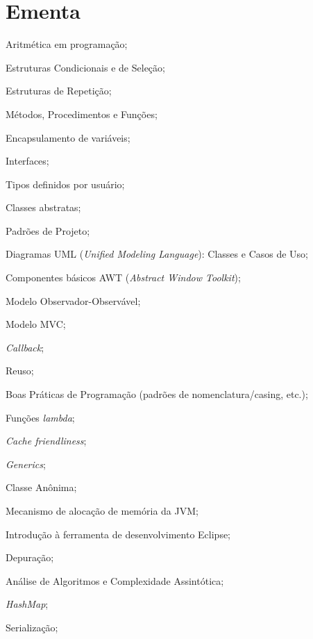 \documentclass{article}
\begin{document}
\section{Ementa}
\begin{itemize*}[label={}]
     \item Aritmética em programação;
     \item Estruturas Condicionais e de Seleção;
     \item Estruturas de Repetição;
     \item Métodos, Procedimentos e Funções;
     \item Encapsulamento de variáveis;
     \item Interfaces;
     \item Tipos definidos por usuário;
     \item Classes abstratas;
     \item Padrões de Projeto;
     \item Diagramas UML (\textit{Unified Modeling Language}): Classes
         e Casos de Uso;
     \item Componentes básicos AWT (\textit{Abstract Window Toolkit});
     \item Modelo Observador-Observável;
     \item Modelo MVC;
     \item \textit{Callback};
     \item Reuso;
     \item Boas Práticas de Programação (padrões de nomenclatura/casing, etc.);
     \item Funções \textit{lambda};
     \item \textit{Cache friendliness};
     \item \textit{Generics};
     \item Classe Anônima;
     \item Mecanismo de alocação de memória da JVM;
     \item Introdução à ferramenta de desenvolvimento Eclipse;
     \item Depuração;
     \item Análise de Algoritmos e Complexidade Assintótica;
     \item \textit{HashMap};
     \item Serialização;
\end{itemize*}
\end{document}
